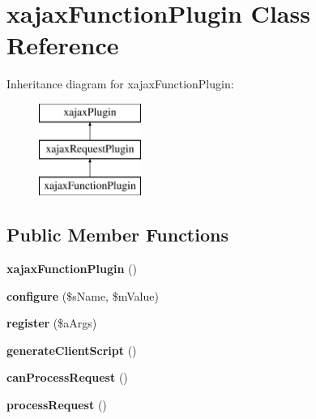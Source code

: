 \hypertarget{classxajaxFunctionPlugin}{
\section{xajaxFunctionPlugin Class Reference}
\label{classxajaxFunctionPlugin}
}
Inheritance diagram for xajaxFunctionPlugin:\begin{figure}[H]
\begin{center}
\leavevmode
\includegraphics[height=3.000000cm]{classxajaxFunctionPlugin}
\end{center}
\end{figure}
\subsection*{Public Member Functions}
\begin{DoxyCompactItemize}
\item 
\hypertarget{classxajaxFunctionPlugin_af5dad95cd1e985cb50665075e6750eb2}{
{\bfseries xajaxFunctionPlugin} ()}
\label{classxajaxFunctionPlugin_af5dad95cd1e985cb50665075e6750eb2}

\item 
\hypertarget{classxajaxFunctionPlugin_a504520fd29d7377fa05728385b4027e0}{
{\bfseries configure} (\$sName, \$mValue)}
\label{classxajaxFunctionPlugin_a504520fd29d7377fa05728385b4027e0}

\item 
\hypertarget{classxajaxFunctionPlugin_ae045560c027ea24e52b6cd3a7aae09cb}{
{\bfseries register} (\$aArgs)}
\label{classxajaxFunctionPlugin_ae045560c027ea24e52b6cd3a7aae09cb}

\item 
\hypertarget{classxajaxFunctionPlugin_a07de623bfe569ca6d7be9fdcbdb7c546}{
{\bfseries generateClientScript} ()}
\label{classxajaxFunctionPlugin_a07de623bfe569ca6d7be9fdcbdb7c546}

\item 
\hypertarget{classxajaxFunctionPlugin_a4eb6ba643df1f84a98ba3bbcc9d678a8}{
{\bfseries canProcessRequest} ()}
\label{classxajaxFunctionPlugin_a4eb6ba643df1f84a98ba3bbcc9d678a8}

\item 
\hypertarget{classxajaxFunctionPlugin_a11fe69481c035913143dd21b7006c714}{
{\bfseries processRequest} ()}
\label{classxajaxFunctionPlugin_a11fe69481c035913143dd21b7006c714}

\end{DoxyCompactItemize}
